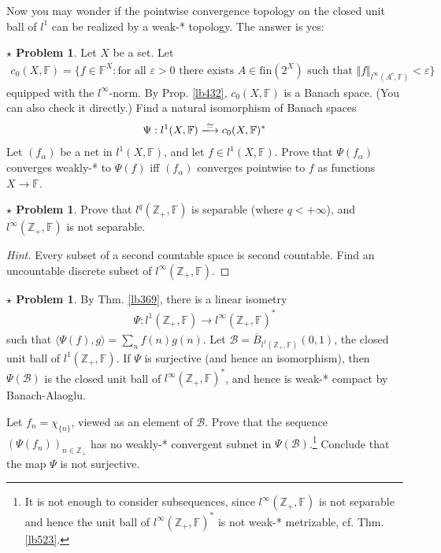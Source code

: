 \documentclass[12pt,b5paper,notitlepage]{article}
\theoremstyle{definition}
\newtheorem{sprob}[prob]{\color{red}$\star$ Problem}
\theoremstyle{plain}
\newcommand{\mc}{\mathcal}
\newcommand{\ovl}{\overline}
\newcommand{\bk}[1]{\langle {#1}\rangle}
\newcommand{\Zbb}{\mathbb Z}
\newcommand{\fin}{\mathrm{fin}}
\newcommand{\Fbb}{\mathbb F}
\newcommand{\eps}{\varepsilon}
\numberwithin{equation}{section}
\begin{document}
Now you may wonder if the pointwise convergence topology on the closed unit ball of $l^1$ can be realized by a weak-* topology. The answer is yes:

\begin{sprob}
Let $X$ be a set. Let
\begin{align*}
c_0(X,\Fbb)=\{f\in\Fbb^X: \text{for all $\eps>0$ there exists $A\in\fin(2^X)$ such that }\Vert f\Vert_{l^\infty(A^c,\Fbb)}<\eps\}
\end{align*}
equipped with the $l^\infty$-norm. By Prop. \ref{lb432}, $c_0(X,\Fbb)$ is a Banach space. (You can also check it directly.) Find a natural isomorphism of Banach spaces
\begin{align}
\Psi:l^1(X,\Fbb)\xlongrightarrow{\simeq} c_0(X,\Fbb)^*
\end{align}
Let $(f_\alpha)$ be a net in $l^1(X,\Fbb)$, and let $f\in l^1(X,\Fbb)$. Prove that $\Psi(f_\alpha)$ converges weakly-* to $\Psi(f)$ iff $(f_\alpha)$ converges pointwise to $f$ as functions $X\rightarrow\Fbb$.
\end{sprob}


\begin{sprob}
Prove that $l^q(\Zbb_+,\Fbb)$ is separable (where $q<+\infty$), and $l^\infty(\Zbb_+,\Fbb)$ is not separable.
\end{sprob}

\begin{proof}[Hint]
Every subset of a second countable space is second countable. Find an uncountable discrete subset of $l^\infty(\Zbb_+,\Fbb)$.
\end{proof}



\begin{sprob}\label{lb532}
By Thm. \ref{lb369}, there is a linear isometry 
\begin{gather}
\Psi:l^1(\Zbb_+,\Fbb)\rightarrow l^\infty(\Zbb_+,\Fbb)^*  \label{eq205}
\end{gather}
such that $\bk{\Psi(f),g}=\sum_n f(n)g(n)$. Let $\mc B=\ovl B_{l^1(\Zbb_+,\Fbb)}(0,1)$, the closed unit ball of $l^1(\Zbb_+,\Fbb)$. If $\Psi$ is surjective (and hence an isomorphism), then $\Psi(\mc B)$ is the closed unit ball of $l^\infty(\Zbb_+,\Fbb)^*$, and hence is weak-* compact by Banach-Alaoglu. 

Let $f_n=\chi_{\{n\}}$, viewed as an element of $\mc B$. Prove that the sequence $(\Psi(f_n))_{n\in\Zbb_+}$ has no weakly-* convergent subnet in $\Psi(\mc B)$.\footnote{It is not enough to consider subsequences, since $l^\infty(\Zbb_+,\Fbb)$ is not separable and hence the unit ball of $l^\infty(\Zbb_+,\Fbb)^*$ is not weak-* metrizable, cf. Thm. \ref{lb523}.} Conclude that the map $\Psi$ is not surjective.  \hfill\qedsymbol
\end{sprob}
\end{document}
